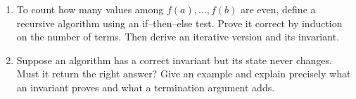 \begin{enumerate}
What state change works when $k$ is even? What works when it is odd?
Prove that the algorithm terminates and uses logarithmically many
multiplications. State what happens when $n=0$.
\item To count how many values among $f(a),\ldots,f(b)$ are even, define a
recursive algorithm using an if--then--else test. Prove it correct by induction
on the number of terms. Then derive an iterative version and its invariant.
\item Suppose an algorithm has a correct invariant but its state never
changes. Must it return the right answer? Give an example and explain
precisely what an invariant proves and what a termination argument adds.
\end{enumerate}
